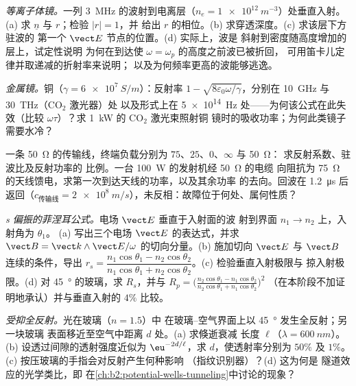 \begin{exercise}[$\star\star$]\label{exo:b2:wave-interfaces:7}
\emph{等离子体镜。}一列 \qty{3}{MHz} 的波射到电离层（$n_e =
\qty{1e12}{m^{-3}}$）处垂直入射。(a) 求 $\underline n$ 与 $r$；检验 $|r| = 1$，并
给出 $r$ 的相位。(b) 求穿透深度。(c) 求该层下方驻波的
第一个 $\vect E$ 节点的位置。(d) 实际上，波是
斜射到密度随高度增加的层上，试定性说明
为何在到达使 $\omega = \omega_p$ 的高度之前波已被折回，
可用笛卡儿定律并取递减的折射率来说明；
以及为何频率更高的波能够逃逸。
\end{exercise}

\begin{exercise}[$\star\star$]\label{exo:b2:wave-interfaces:8}
\emph{金属镜。}铜（$\gamma = \qty{6e7}{S/m}$）：反射率 $1 -
\sqrt{8\varepsilon_0\omega/\gamma}$，分别在 \qty{10}{GHz} 与 \qty{30}{THz}（CO$_2$ 激光器）处
以及形式上在 \qty{5e14}{Hz} 处——为何该公式在此失效（比较
$\omega\tau$）？求 \qty{1}{kW} 的 CO$_2$ 激光束照射铜
镜时的吸收功率；为何此类镜子需要水冷？
\end{exercise}

\begin{exercise}[$\star\star$]\label{exo:b2:wave-interfaces:9}
一条 \qty{50}{\ohm} 的传输线，终端负载分别为 $75$、$25$、$0$、$\infty$ 与 \qty{50}{\ohm}：
求反射系数、驻波比及反射功率的
比例。一台 \qty{100}{W} 的发射机经 \qty{50}{\ohm} 的电缆
向阻抗为 \qty{75}{\ohm} 的天线馈电，求第一次到达天线的功率，以及其余功率
的去向。回波在 \qty{1.2}{\micro s} 后返回（$c_{\text{传输线}}
= \qty{2e8}{m/s}$），未反相：故障位于何处、属何性质？
\end{exercise}

\begin{exercise}[$\star\star\star$]\label{exo:b2:wave-interfaces:10}
\emph{s 偏振的菲涅耳公式。}电场 $\vect E$ 垂直于入射面的波
射到界面 $n_1 \to n_2$ 上，入射角为 $\theta_1$。
(a) 写出三个电场 $\vect E$ 的表达式，并求
$\vect B = \vect k\wedge\vect E/\omega$ 的切向分量。(b) 施加切向
$\vect E$ 与 $\vect B$ 连续的条件，导出 $r_s = \dfrac{n_1\cos\theta_1 - n_2\cos\theta_2}
{n_1\cos\theta_1 + n_2\cos\theta_2}$。(c) 检验垂直入射极限与
掠入射极限。(d) 对 \qty{45}{\degree} 的玻璃，求 $R_s$，并与 $R_p
= \bigl(\frac{n_2\cos\theta_1 - n_1\cos\theta_2}{n_2\cos\theta_1 + n_1\cos\theta_2}\bigr)^2$
（在本阶段不加证明地承认）并与垂直入射的 $4\%$ 比较。
\end{exercise}

\begin{exercise}[$\star\star\star$]\label{exo:b2:wave-interfaces:11}
\emph{受抑全反射。}光在玻璃（$n = 1.5$）中
在玻璃–空气界面上以 \qty{45}{\degree} 发生全反射；另一块玻璃
表面移近至空气中距离 $d$ 处。(a) 求倏逝衰减
长度 $\ell$（$\lambda = \qty{600}{nm}$）。(b) 设透过间隙的透射强度近似为
$\eu^{-2d/\ell}$，求 $d$，使透射率分别为 $50\%$
及 $1\%$。(c) 按压玻璃的手指会对反射产生何种影响
（指纹识别器）？(d) 这为何是
隧道效应的光学类比，即
在\cref{ch:b2:potential-wells-tunneling}中讨论的现象？
\end{exercise}


